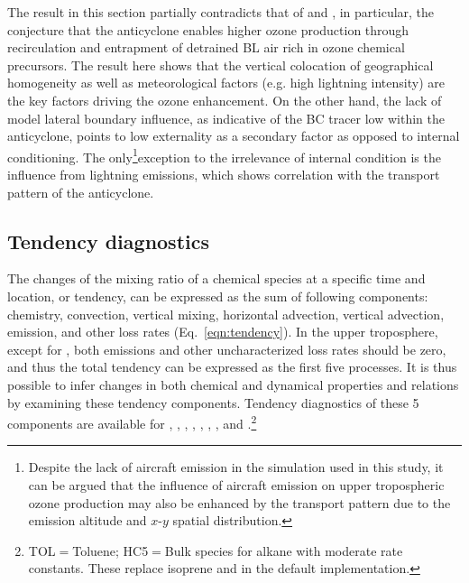The result in this section partially contradicts that of \citet{Li:2005ss} and \citet{Cooper:2007cr}, in particular, the conjecture that the anticyclone
enables higher ozone production through recirculation and entrapment of detrained BL air rich in ozone chemical precursors. The result here
shows that the vertical colocation of geographical homogeneity as well as meteorological factors (e.g. high lightning intensity) are the key factors
driving the ozone enhancement. On the other hand, the lack of model lateral boundary influence, as indicative of the BC tracer low within the
anticyclone, points to low externality as a secondary factor as opposed to internal conditioning. The only\footnote{Despite the lack of aircraft
emission in the simulation used in this study, it can be argued that the influence of aircraft emission on upper tropospheric ozone production
may also be enhanced by the transport pattern due to the emission altitude and $x$-$y$ spatial distribution.}exception to the irrelevance of
internal condition is the influence from lightning emissions, which shows correlation with the transport pattern of the anticyclone.

\subsection{Tendency diagnostics}\label{ssec:2006/discuss/tendency}

The changes of the mixing ratio of a chemical species at a specific time and location, or tendency, can be expressed as
the sum of following components: chemistry, convection, vertical mixing, horizontal advection, vertical advection, emission,
and other loss rates (Eq.~\ref{eqn:tendency}). In the upper troposphere, except for , both emissions and other
uncharacterized loss rates should be zero, and thus the total tendency can be expressed as the first five processes. It is thus
possible to infer changes in both chemical and dynamical properties and relations by examining these tendency components.
Tendency diagnostics of these 5 components are available for , , , , ,
, , and .\footnote{TOL$=$Toluene; HC5$=$Bulk species for alkane with moderate 
rate constants. These replace isoprene and  in the default implementation.}


